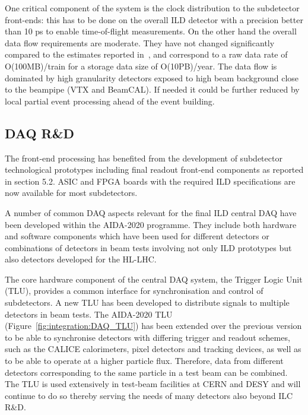 One critical component of the system is the clock distribution to the subdetector front-ends: this has to be done on the overall ILD detector with a precision better than 10 ps to enable time-of-flight measurements. On the other hand the overall data flow requirements are moderate. They have not changed significantly compared to the estimates reported in~\cite{ild:bib:ilddbd}, and correspond to a raw data rate of O(100MB)/train for a storage data size of O(10PB)/year. The data flow is dominated by high granularity detectors exposed to high beam background close to the beampipe (VTX and BeamCAL). If needed it could be further reduced by local partial event processing ahead of the event building.

\subsection{DAQ R\&D}

The front-end processing has benefited from the development of subdetector technological prototypes including final readout front-end components as reported in section 5.2. ASIC and FPGA boards with the required ILD specifications are now available for most subdetectors.

A number of common DAQ aspects relevant for the final ILD central DAQ have been developed \cite{ild:bib:AIDADAQ} within the AIDA-2020 programme. They include both hardware and software components which have been used for different detectors or combinations of detectors in beam tests involving not only ILD prototypes but also detectors developed for the HL-LHC. 

The core hardware component of the central DAQ system, the Trigger Logic Unit (TLU), provides a common interface for synchronisation and control of subdetectors. A new TLU has been developed to distribute signals to multiple detectors in beam tests. The AIDA-2020 TLU (Figure~\ref{fig:integration:DAQ_TLU}) has been extended over the previous version to be able to synchronise detectors with differing trigger and readout schemes, such as the CALICE calorimeters, pixel detectors and tracking devices, as well as to be able to operate at a higher particle flux. Therefore, data from different detectors corresponding to the same particle in a test beam can be combined. The TLU is used extensively in test-beam facilities at CERN and DESY and will continue to do so thereby serving the needs of many detectors also beyond ILC R\&D. 

